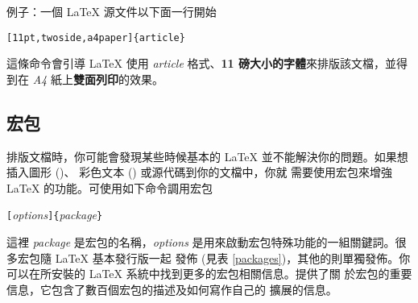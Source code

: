 
例子：一個 \LaTeX{} 源文件以下面一行開始
\begin{code}
\verb|[11pt,twoside,a4paper]{article}|
\end{code}
這條命令會引導 \LaTeX{} 使用 \emph{article} 格式、\textbf{11 磅大小的字體}來排版該文檔，並得到在 \emph{A4} 紙上\textbf{雙面列印}的效果。 \pagebreak[2]

\subsection{宏包}

排版文檔時，你可能會發現某些時候基本的 \LaTeX{} 並不能解決你的問題。如果想插入圖形 ()、
彩色文本 () 或源代碼到你的文檔中，你就
需要使用宏包來增強 \LaTeX{} 的功能。可使用如下命令調用宏包
\begin{lscommand}
\verb|[|\emph{options}\verb|]{|\emph{package}\verb|}|
\end{lscommand}
\noindent%
這裡 \emph{package} 是宏包的名稱，\emph{options} 是用來啟動宏包特殊功能的一組關鍵詞。很多宏包隨 \LaTeX{} 基本發行版一起
發佈 (見表 \ref{packages})，其他的則單獨發佈。你可以在所安裝的 \LaTeX{} 系統中找到更多的宏包相關信息。\companion 提供了關
於宏包的重要信息，它包含了數百個宏包的描述及如何寫作自己的 \LaTeXe{} 擴展的信息。

